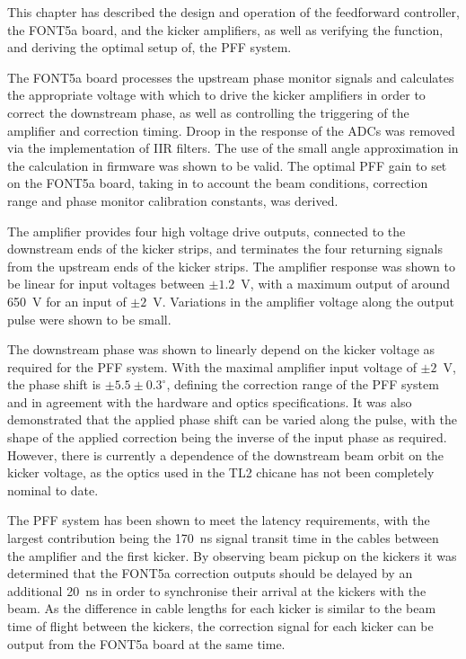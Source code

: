 %
%
%
%


This chapter has described the design and operation of the feedforward controller, the FONT5a board, and the kicker amplifiers, as well as verifying the function, and deriving the optimal setup of, the PFF system. 

The FONT5a board processes the upstream phase monitor signals and calculates the appropriate voltage with which to drive the kicker amplifiers in order to correct the downstream phase, as well as controlling the triggering of the amplifier and correction timing. Droop in the response of the ADCs was removed via the implementation of IIR filters. The use of the small angle approximation in the calculation in firmware was shown to be valid. The optimal PFF gain to set on the FONT5a board, taking in to account the beam conditions, correction range and phase monitor calibration constants, was derived.


The amplifier provides four high voltage drive outputs, connected to the downstream ends of the kicker strips, and terminates the four returning signals from the upstream ends of the kicker strips. The amplifier response was shown to be linear for input voltages between \(\pm1.2\)~V, with a maximum output of around 650~V for an input of \(\pm2\)~V. Variations in the amplifier voltage along the output pulse were shown to be small.

The downstream phase was shown to linearly depend on the kicker voltage as required for the PFF system. With the maximal amplifier input voltage of \(\pm2\)~V, the phase shift is \(\pm5.5\pm0.3^\circ\), defining the correction range of the PFF system and in agreement with the hardware and optics specifications. It was also demonstrated that the applied phase shift can be varied along the pulse, with the shape of the applied correction being the inverse of the input phase as required. However, there is currently a dependence of the downstream beam orbit on the kicker voltage, as the optics used in the TL2 chicane has not been completely nominal to date.
 
The PFF system has been shown to meet the latency requirements, with the largest contribution being the 170~ns signal transit time in the cables between the amplifier and the first kicker. By observing beam pickup on the kickers it was determined that the FONT5a correction outputs should be delayed by an additional 20~ns in order to synchronise their arrival at the kickers with the beam. As the difference in cable lengths for each kicker is similar to the beam time of flight between the kickers, the correction signal for each kicker can be output from the FONT5a board at the same time.